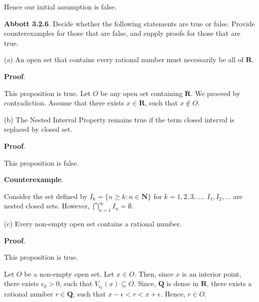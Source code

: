 \documentclass[10pt]{article}
\begin{document}
Hence our initial assumption is false.



\textbf{Abbott 3.2.6}. Decide whether the following statements are true or false. Provide counterexamples for those that are false, and supply proofs for those that are true.



(a) An open set that contains every rational number must necessarily be all of $\displaystyle \mathbf{R}$.



\textbf{Proof}.



This proposition is true. Let $\displaystyle O$ be any open set containing $\displaystyle \mathbf{R}$. We proceed by contradiction. Assume that there exists $\displaystyle x\in \mathbf{R}$, such that $\displaystyle x\notin O$.



(b) The Nested Interval Property remains true if the term closed interval is replaced by closed set.



\textbf{Proof}.



This proposition is false.



\textbf{Counterexample}.



Consider the set defined by $\displaystyle I_{k} =\{n\geq k:n\in \mathbf{N}\}$ for $\displaystyle k=1,2,3,\dotsc $. $\displaystyle I_{1} ,I_{2} ,\dotsc $ are nested closed sets. However, $\displaystyle \bigcap _{n=1}^{\infty } I_{n} =\emptyset $.



(c) Every non-empty open set contains a rational number.



\textbf{Proof}.



This proposition is true.



Let $\displaystyle O$ be a non-empty open set. Let $\displaystyle x\in O$. Then, since $\displaystyle x$ is an interior point, there exists $\displaystyle \epsilon _{0}  >0$, such that $\displaystyle V_{\epsilon _{0}}( x) \subseteq O$. Since, $\displaystyle \mathbf{Q}$ is dense in $\displaystyle \mathbf{R}$, there exists a rational number $\displaystyle r\in \mathbf{Q}$, such that $\displaystyle x-\epsilon < r< x+\epsilon $. Hence, $\displaystyle r\in O$.
\end{document}
